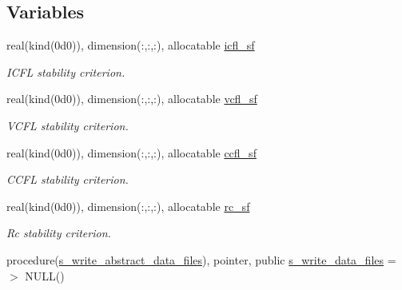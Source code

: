 \subsection*{Variables}
\begin{DoxyCompactItemize}
\item 
real(kind(0d0)), dimension(\+:,\+:,\+:), allocatable \hyperlink{namespacem__data__output_a1ca202582d46c282b83b5510e6b6d626}{icfl\+\_\+sf}
\begin{DoxyCompactList}\small\item\em I\+C\+FL stability criterion. \end{DoxyCompactList}\item 
real(kind(0d0)), dimension(\+:,\+:,\+:), allocatable \hyperlink{namespacem__data__output_a629c072bc28e09fe890b966f8adb5f55}{vcfl\+\_\+sf}
\begin{DoxyCompactList}\small\item\em V\+C\+FL stability criterion. \end{DoxyCompactList}\item 
real(kind(0d0)), dimension(\+:,\+:,\+:), allocatable \hyperlink{namespacem__data__output_a660d600ba9338118f6992a0d76bd6a68}{ccfl\+\_\+sf}
\begin{DoxyCompactList}\small\item\em C\+C\+FL stability criterion. \end{DoxyCompactList}\item 
real(kind(0d0)), dimension(\+:,\+:,\+:), allocatable \hyperlink{namespacem__data__output_a700c4b4763b7c2c1479fc05a658fa28d}{rc\+\_\+sf}
\begin{DoxyCompactList}\small\item\em Rc stability criterion. \end{DoxyCompactList}\item 
procedure(\hyperlink{interfacem__data__output_1_1s__write__abstract__data__files}{s\+\_\+write\+\_\+abstract\+\_\+data\+\_\+files}), pointer, public \hyperlink{namespacem__data__output_a1ba4e8126b198fb2147d4d9b60f74e44}{s\+\_\+write\+\_\+data\+\_\+files} =$>$ N\+U\+LL()
\end{DoxyCompactItemize}
